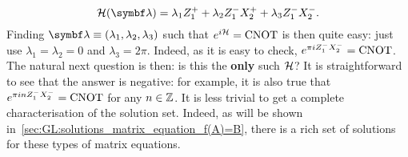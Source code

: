 \begin{example}[label=ex:eigendecomposition_cnot]
\begin{equation}
    \calH(\bs\lambda) = \lambda_1 Z_1^+ + \lambda_2 Z_1^- X_2^+ + \lambda_3 Z_1^- X_2^-.
\end{equation}
Finding $\bs\lambda\equiv(\lambda_1,\lambda_2,\lambda_3)$ such that $e^{i{\mathcal{H}}}=\operatorname{CNOT}$ is then quite easy: just use $\lambda_1=\lambda_2=0$ and $\lambda_3=2\pi$. Indeed, as it is easy to check, $e^{\pi i Z_1^- X_2^-} = \operatorname{CNOT}$.
The natural next question is then: is this the \textbf{only} such ${\mathcal{H}}$? It is straightforward to see that the answer is negative: for example, it is also true that $e^{\pi i n Z_1^- X_2^-}=\operatorname{CNOT}$ for any $n\in\mathbb{Z}$.
It is less trivial to get a complete characterisation of the solution set.
Indeed, as will be shown in~\cref{sec:GL:solutions_matrix_equation_f(A)=B}, there is a rich set of solutions for these types of matrix equations.
\end{example}

